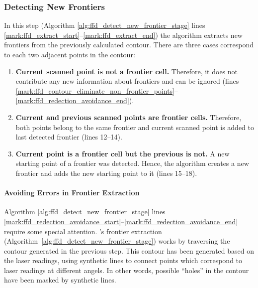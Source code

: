 \newpage
	\subsubsection{Detecting New Frontiers} \label{section:detecting_new_frontiers}
	In this step (Algorithm \ref{alg:ffd_detect_new_frontier_stage} lines
	\ref{mark:ffd_extract_start}--\ref{mark:ffd_extract_end}) the algorithm extracts new frontiers from the previously calculated contour. There are three cases correspond to each two adjacent points in the
	contour: 
	\begin{enumerate}
	\item \textbf{Current scanned point is not a frontier cell.} Therefore,
	it does not contribute any new information about frontiers and can be ignored (lines 	\ref{mark:ffd_contour_eliminate_non_frontier_points}--\ref{mark:ffd_redection_avoidance_end}).
	
	\item \textbf{Current and previous scanned points are frontier cells.} Therefore, both points belong to the same frontier and current scanned point is added to last detected frontier (lines 12--14).
	
	\item \textbf{Current point is a frontier cell but the previous is
	not.} A new starting point of a frontier was detected. Hence, the algorithm creates a
	new frontier and adds the new starting point to it (lines 15--18).
	\end{enumerate}



	\paragraph{Avoiding Errors in Frontier Extraction}
	\label{section:avoiding_redetection}

    Algorithm \ref{alg:ffd_detect_new_frontier_stage} lines    	\ref{mark:ffd_redection_avoidance_start}--\ref{mark:ffd_redection_avoidance_end} require some
    special attention.  
    \FFD's frontier extraction (Algorithm~\ref{alg:ffd_detect_new_frontier_stage}) works by
    traversing the contour generated in the previous step. This contour has been generated based
    on the laser readings, using synthetic lines to connect points which correspond to laser
    readings at different angels. In other words, possible ``holes'' in the contour have been
    masked by synthetic lines.
    
